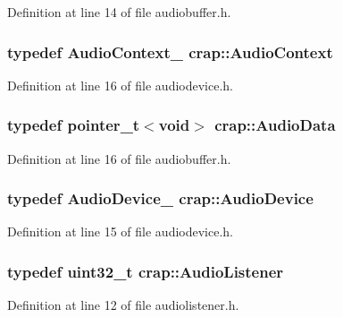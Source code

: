 Definition at line 14 of file audiobuffer.\+h.

\hypertarget{namespacecrap_a4d9ca11977af369032d36460bc1c80e7}{
\subsubsection[{Audio\+Context}]{\setlength{\rightskip}{0pt plus 5cm}typedef {\bf Audio\+Context\+\_\+} {\bf crap\+::\+Audio\+Context}}}\label{namespacecrap_a4d9ca11977af369032d36460bc1c80e7}


Definition at line 16 of file audiodevice.\+h.

\hypertarget{namespacecrap_a0566c0c5049ce39b01856c01d2669f2c}{
\subsubsection[{Audio\+Data}]{\setlength{\rightskip}{0pt plus 5cm}typedef {\bf pointer\+\_\+t}$<$void$>$ {\bf crap\+::\+Audio\+Data}}}\label{namespacecrap_a0566c0c5049ce39b01856c01d2669f2c}


Definition at line 16 of file audiobuffer.\+h.

\hypertarget{namespacecrap_a0554191481198902f832204ecc2db4c0}{
\subsubsection[{Audio\+Device}]{\setlength{\rightskip}{0pt plus 5cm}typedef {\bf Audio\+Device\+\_\+} {\bf crap\+::\+Audio\+Device}}}\label{namespacecrap_a0554191481198902f832204ecc2db4c0}


Definition at line 15 of file audiodevice.\+h.

\hypertarget{namespacecrap_a73b9ecbfa0198e8a702c3569958e1653}{
\subsubsection[{Audio\+Listener}]{\setlength{\rightskip}{0pt plus 5cm}typedef uint32\+\_\+t {\bf crap\+::\+Audio\+Listener}}}\label{namespacecrap_a73b9ecbfa0198e8a702c3569958e1653}


Definition at line 12 of file audiolistener.\+h.

